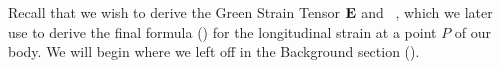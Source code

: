 Recall that we wish to derive the Green Strain Tensor ${\bf{E}}$ and ~, which we later use to 
derive the final formula () for the longitudinal strain at a point $P$ of our body.
We will begin where we 
left off in the Background section ().  
% 
% 
